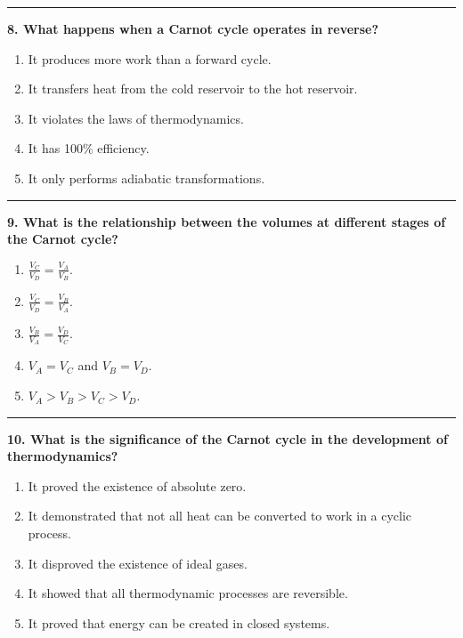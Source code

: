 \documentclass[
  9pt,
]{extbook}
\providecommand{\tightlist}{%
  \setlength{\itemsep}{0pt}\setlength{\parskip}{0pt}}
\theoremstyle{definition}
\theoremstyle{definition}
\theoremstyle{definition}
\theoremstyle{definition}
\theoremstyle{remark}
\begin{document}
\begin{center}\rule{0.5\linewidth}{0.5pt}\end{center}

\textbf{8. What happens when a Carnot cycle operates in reverse?}

\begin{enumerate}
\def\labelenumi{\alph{enumi}.}
\tightlist
\item
  It produces more work than a forward cycle.
\item
  It transfers heat from the cold reservoir to the hot reservoir.
\item
  It violates the laws of thermodynamics.
\item
  It has 100\% efficiency.
\item
  It only performs adiabatic transformations.
\end{enumerate}

\begin{center}\rule{0.5\linewidth}{0.5pt}\end{center}

\textbf{9. What is the relationship between the volumes at different stages of the Carnot cycle?}

\begin{enumerate}
\def\labelenumi{\alph{enumi}.}
\tightlist
\item
  \(\frac{V_C}{V_D} = \frac{V_A}{V_B}\).
\item
  \(\frac{V_C}{V_D} = \frac{V_B}{V_A}\).
\item
  \(\frac{V_B}{V_A} = \frac{V_D}{V_C}\).
\item
  \(V_A = V_C\) and \(V_B = V_D\).
\item
  \(V_A > V_B > V_C > V_D\).
\end{enumerate}

\begin{center}\rule{0.5\linewidth}{0.5pt}\end{center}

\textbf{10. What is the significance of the Carnot cycle in the development of thermodynamics?}

\begin{enumerate}
\def\labelenumi{\alph{enumi}.}
\tightlist
\item
  It proved the existence of absolute zero.
\item
  It demonstrated that not all heat can be converted to work in a cyclic process.
\item
  It disproved the existence of ideal gases.
\item
  It showed that all thermodynamic processes are reversible.
\item
  It proved that energy can be created in closed systems.
\end{enumerate}
\end{document}
